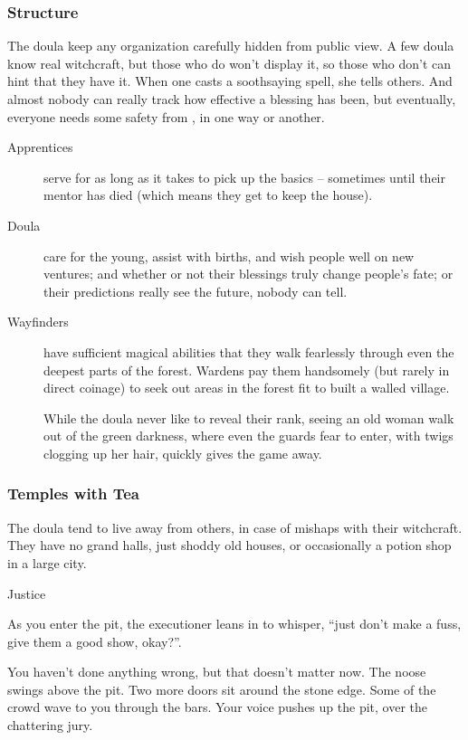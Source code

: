 \begin{multicols}{2}
\subsubsection{Structure}
The doula keep any organization carefully hidden from public view.
A few doula know real witchcraft, but those who do won't display it, so those who don't can hint that they have it.
When one casts a soothsaying spell, she tells others.
And almost nobody can really track how effective a blessing has been, but eventually, everyone needs some safety from \hphantom{Nemo}, in one way or another.

\begin{description}
  \item[Apprentices]
  serve for as long as it takes to pick up the basics -- sometimes until their mentor has died (which means they get to keep the house).
  \item[Doula]
  care for the young, assist with births, and wish people well on new ventures; and whether or not their blessings truly change people's fate; or their predictions really see the future, nobody can tell.
  \item[Wayfinders]
  have sufficient magical abilities that they walk fearlessly through even the deepest parts of the forest.
  Wardens pay them handsomely (but rarely in direct coinage) to seek out areas in the forest fit to built a walled village.

  While the doula never like to reveal their rank, seeing an old woman walk out of the green darkness, where even the \glspl{guard} fear to enter, with twigs clogging up her hair, quickly gives the game away.
\end{description}

\subsubsection{Temples with Tea}
The doula tend to live away from others, in case of mishaps with their witchcraft.
They have no grand halls, just shoddy old houses, or occasionally a potion shop in a large city.

  {\statDot}%
  {Justice}%
  {
    As you enter the pit, the executioner leans in to whisper, ``just don't make a fuss, give them a good show, okay?''.

    You haven't done anything wrong, but that doesn't matter now.
    The noose swings above the pit.
    Two more doors sit around the stone edge.
    Some of the crowd wave to you through the bars.
    Your voice pushes up the pit, over the chattering jury.

}
\end{multicols}
